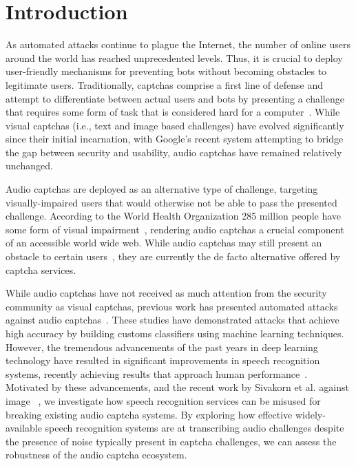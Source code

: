 \section{Introduction}
\label{sec:intro}

As automated attacks continue to plague the Internet,
the number of online users around the world has reached unprecedented levels.
Thus, it is crucial to deploy user-friendly mechanisms for preventing bots without
becoming obstacles to legitimate users. Traditionally, captchas comprise a first
line of defense and attempt to differentiate between actual users and bots by 
presenting a challenge that requires some form of task that is considered hard 
for a computer~\cite{captcha}. While visual captchas (i.e., text and image based challenges) 
have evolved significantly since their initial incarnation, with Google's recent \re system
attempting to bridge the gap between security and usability, audio captchas have remained 
relatively unchanged.

Audio captchas are deployed as an alternative type of challenge, targeting
visually-impaired users that would otherwise not be able to pass the presented
challenge. According to the World Health Organization 285 million people have 
some form of visual impairment~\cite{impaired}, rendering audio captchas a
crucial component of an accessible world wide web. While audio captchas may still present
an obstacle to certain users~\cite{sauer2008towards,bigham2008inspiring,bigham2009evaluating},
they are currently the de facto alternative offered by captcha services.

While audio captchas have not received as much attention from the security community as visual captchas,
previous work has presented automated attacks against audio captchas~\cite{Sano2013,Bursztein2009,
meutzner2014using,tam2009breaking,bursztein2011failure}. These studies have demonstrated attacks
that achieve high accuracy by building customs classifiers using machine learning techniques.
However, the tremendous advancements of the past years in deep learning technology have
resulted in significant improvements in speech recognition systems, recently achieving
results that approach human performance~\cite{ibm_blog,saon2017english}. Motivated
by these advancements, and the recent work by Sivakorn et al. against image 
\re~\cite{sivakorn:eurosp16}, we investigate how speech recognition services
can be misused for breaking existing audio captcha systems. By exploring how effective
widely-available speech recognition systems are at transcribing audio challenges despite 
the presence of noise typically present in captcha challenges, we can assess the robustness 
of the audio captcha ecosystem.

